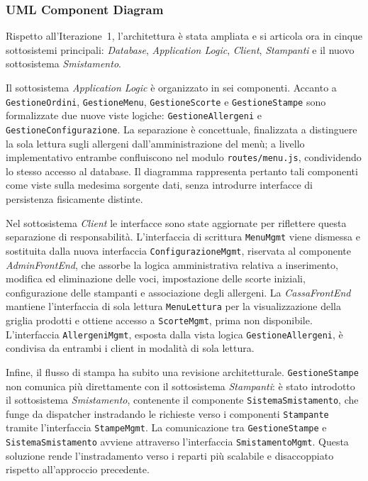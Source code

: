 \subsubsection{UML Component Diagram}
Rispetto all'Iterazione~1, l'architettura è stata ampliata e si articola ora in cinque sottosistemi principali: \textit{Database}, \textit{Application Logic}, \textit{Client}, \textit{Stampanti} e il nuovo sottosistema \textit{Smistamento}.

Il sottosistema \textit{Application Logic} è organizzato in sei componenti. Accanto a \texttt{GestioneOrdini}, \texttt{GestioneMenu}, \texttt{GestioneScorte} e \texttt{GestioneStampe} sono formalizzate due nuove viste logiche: \texttt{GestioneAllergeni} e \texttt{GestioneConfigurazione}. La separazione è concettuale, finalizzata a distinguere la sola lettura sugli allergeni dall'amministrazione del menù; a livello implementativo entrambe confluiscono nel modulo \texttt{routes/menu.js}, condividendo lo stesso accesso al database. Il diagramma rappresenta pertanto tali componenti come viste sulla medesima sorgente dati, senza introdurre interfacce di persistenza fisicamente distinte.

Nel sottosistema \textit{Client} le interfacce sono state aggiornate per riflettere questa separazione di responsabilità. L'interfaccia di scrittura \texttt{MenuMgmt} viene dismessa e sostituita dalla nuova interfaccia \texttt{ConfigurazioneMgmt}, riservata al componente \textit{AdminFrontEnd}, che assorbe la logica amministrativa relativa a inserimento, modifica ed eliminazione delle voci, impostazione delle scorte iniziali, configurazione delle stampanti e associazione degli allergeni. La \textit{CassaFrontEnd} mantiene l'interfaccia di sola lettura \texttt{MenuLettura} per la visualizzazione della griglia prodotti e ottiene accesso a \texttt{ScorteMgmt}, prima non disponibile. L'interfaccia \texttt{AllergeniMgmt}, esposta dalla vista logica \texttt{GestioneAllergeni}, è condivisa da entrambi i client in modalità di sola lettura.

Infine, il flusso di stampa ha subito una revisione architetturale. \texttt{GestioneStampe} non comunica più direttamente con il sottosistema \textit{Stampanti}: è stato introdotto il sottosistema \textit{Smistamento}, contenente il componente \texttt{SistemaSmistamento}, che funge da dispatcher instradando le richieste verso i componenti \texttt{Stampante} tramite l'interfaccia \texttt{StampeMgmt}. La comunicazione tra \texttt{GestioneStampe} e \texttt{SistemaSmistamento} avviene attraverso l'interfaccia \texttt{SmistamentoMgmt}. Questa soluzione rende l'instradamento verso i reparti più scalabile e disaccoppiato rispetto all'approccio precedente.

